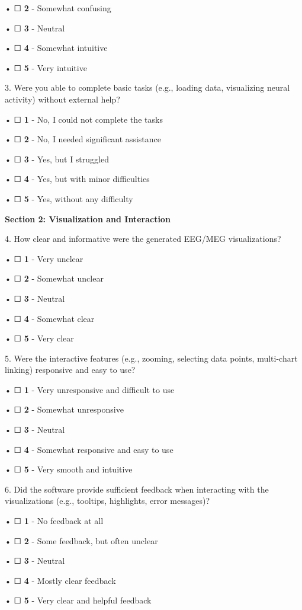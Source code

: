 \documentclass[
]{article}
\begin{document}
• ☐ \textbf{2} - Somewhat confusing

• ☐ \textbf{3} - Neutral

• ☐ \textbf{4} - Somewhat intuitive

• ☐ \textbf{5} - Very intuitive

3. Were you able to complete basic tasks (e.g., loading data,
visualizing neural activity) without external help?

• ☐ \textbf{1} - No, I could not complete the tasks

• ☐ \textbf{2} - No, I needed significant assistance

• ☐ \textbf{3} - Yes, but I struggled

• ☐ \textbf{4} - Yes, but with minor difficulties

• ☐ \textbf{5} - Yes, without any difficulty

\textbf{Section 2: Visualization and Interaction}

4. How clear and informative were the generated EEG/MEG visualizations?

• ☐ \textbf{1} - Very unclear

• ☐ \textbf{2} - Somewhat unclear

• ☐ \textbf{3} - Neutral

• ☐ \textbf{4} - Somewhat clear

• ☐ \textbf{5} - Very clear

5. Were the interactive features (e.g., zooming, selecting data points,
multi-chart linking) responsive and easy to use?

• ☐ \textbf{1} - Very unresponsive and difficult to use

• ☐ \textbf{2} - Somewhat unresponsive

• ☐ \textbf{3} - Neutral

• ☐ \textbf{4} - Somewhat responsive and easy to use

• ☐ \textbf{5} - Very smooth and intuitive

6. Did the software provide sufficient feedback when interacting with
the visualizations (e.g., tooltips, highlights, error messages)?

• ☐ \textbf{1} - No feedback at all

• ☐ \textbf{2} - Some feedback, but often unclear

• ☐ \textbf{3} - Neutral

• ☐ \textbf{4} - Mostly clear feedback

• ☐ \textbf{5} - Very clear and helpful feedback
\end{document}
